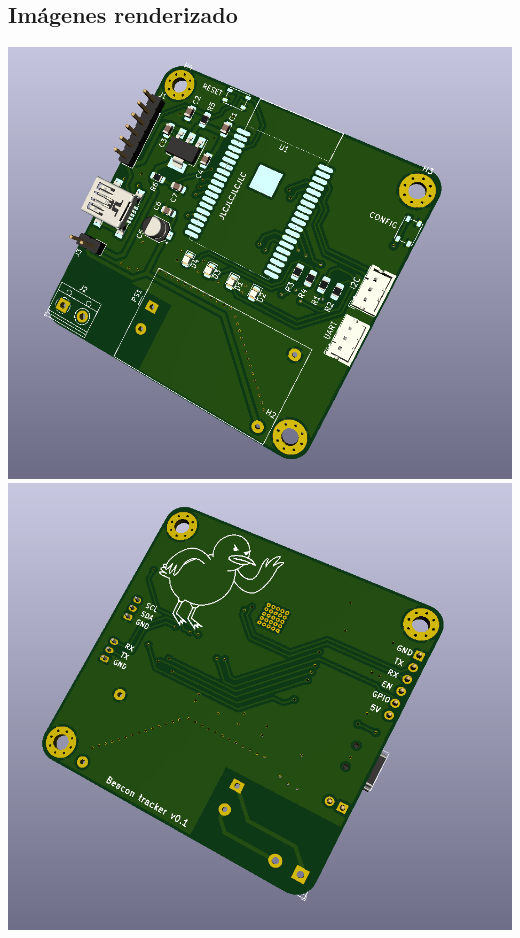 \documentclass[a4paper ,12pt, onecolumn]{article}
\begin{document}
    \subsection{Imágenes renderizado}
    \begin{center}
        \includegraphics[scale=0.25]{../receiver_1.PNG}
        \includegraphics[scale=0.25]{../receiver_2.PNG}
    \end{center}
\end{document}
